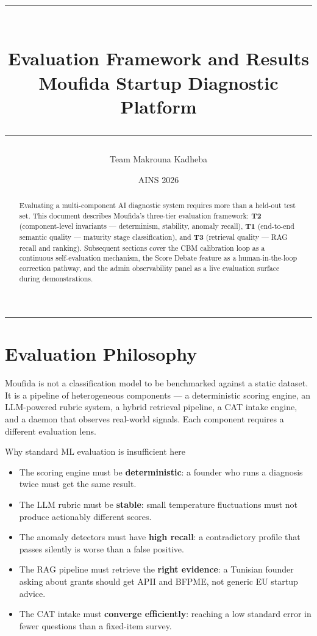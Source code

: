 \documentclass[11pt,a4paper]{article}
\title{%
  {\color{EvalGreen}\rule{\linewidth}{1.5pt}}\\[6pt]
  \textbf{\Large Evaluation Framework and Results}\\[4pt]
  {\normalsize Moufida Startup Diagnostic Platform}\\[6pt]
  {\color{EvalGreen}\rule{\linewidth}{0.8pt}}
}
\author{Team Makrouna Kadheba}
\date{AINS 2026}
\begin{document}
\maketitle\thispagestyle{empty}

\begin{abstract}\small
Evaluating a multi-component AI diagnostic system requires more than a held-out test set.
This document describes Moufida's three-tier evaluation framework:
\textbf{T2} (component-level invariants — determinism, stability, anomaly recall),
\textbf{T1} (end-to-end semantic quality — maturity stage classification), and
\textbf{T3} (retrieval quality — RAG recall and ranking).
Subsequent sections cover the CBM calibration loop as a continuous self-evaluation
mechanism, the Score Debate feature as a human-in-the-loop correction pathway, and
the admin observability panel as a live evaluation surface during demonstrations.
\end{abstract}

\tableofcontents
\vspace{6pt}
\noindent\color{EvalGreen}\rule{\linewidth}{0.4pt}

\section{Evaluation Philosophy}

Moufida is not a classification model to be benchmarked against a static dataset.
It is a pipeline of heterogeneous components — a deterministic scoring engine,
an LLM-powered rubric system, a hybrid retrieval pipeline, a CAT intake engine,
and a daemon that observes real-world signals. Each component requires a different
evaluation lens.

\begin{metricbox}{Why standard ML evaluation is insufficient here}
\begin{itemize}[leftmargin=1em]
  \item The scoring engine must be \textbf{deterministic}: a founder who runs a diagnosis
        twice must get the same result.
  \item The LLM rubric must be \textbf{stable}: small temperature fluctuations must not
        produce actionably different scores.
  \item The anomaly detectors must have \textbf{high recall}: a contradictory profile that
        passes silently is worse than a false positive.
  \item The RAG pipeline must retrieve the \textbf{right evidence}: a Tunisian founder
        asking about grants should get APII and BFPME, not generic EU startup advice.
  \item The CAT intake must \textbf{converge efficiently}: reaching a low standard error
        in fewer questions than a fixed-item survey.
\end{itemize}
\end{metricbox}
\end{document}
